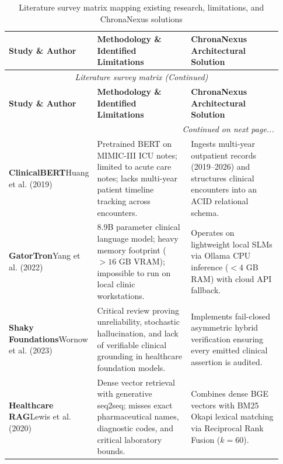 \small
\begin{longtable}{@{}p{0.24\linewidth} p{0.35\linewidth} p{0.34\linewidth}@{}}
\caption{Literature survey matrix mapping existing research, limitations, and ChronaNexus solutions}\label{tab:2_2_literature_matrix} \\
\toprule
\textbf{Study \& Author} & \textbf{Methodology \& Identified Limitations} & \textbf{ChronaNexus Architectural Solution} \\
\midrule
\endfirsthead
\toprule
\multicolumn{3}{c}{\small\textit{Literature survey matrix (Continued)}} \\[4pt]
\midrule
\textbf{Study \& Author} & \textbf{Methodology \& Identified Limitations} & \textbf{ChronaNexus Architectural Solution} \\
\midrule
\endhead
\midrule
\multicolumn{3}{r}{\footnotesize\textit{Continued on next page...}} \\
\bottomrule
\endfoot
\bottomrule
\endlastfoot
\textbf{ClinicalBERT}\newline Huang et al. (2019)~\cite{huang2019clinicalbert} & Pretrained BERT on MIMIC-III ICU notes; limited to acute care notes; lacks multi-year patient timeline tracking across encounters. & Ingests multi-year outpatient records (2019--2026) and structures clinical encounters into an ACID relational schema. \\
\midrule
\textbf{GatorTron}\newline Yang et al. (2022)~\cite{yang2022gatortron} & 8.9B parameter clinical language model; heavy memory footprint ($>16\text{ GB}$ VRAM); impossible to run on local clinic workstations. & Operates on lightweight local SLMs via Ollama CPU inference ($<4\text{ GB}$ RAM) with cloud API fallback. \\
\midrule
\textbf{Shaky Foundations}\newline Wornow et al. (2023)~\cite{wornow2023shaky} & Critical review proving unreliability, stochastic hallucination, and lack of verifiable clinical grounding in healthcare foundation models. & Implements fail-closed asymmetric hybrid verification ensuring every emitted clinical assertion is audited. \\
\midrule
\textbf{Healthcare RAG}\newline Lewis et al. (2020)~\cite{lewis2020rag} & Dense vector retrieval with generative seq2seq; misses exact pharmaceutical names, diagnostic codes, and critical laboratory bounds. & Combines dense BGE vectors with BM25 Okapi lexical matching via Reciprocal Rank Fusion ($k=60$). \\

\end{longtable}
